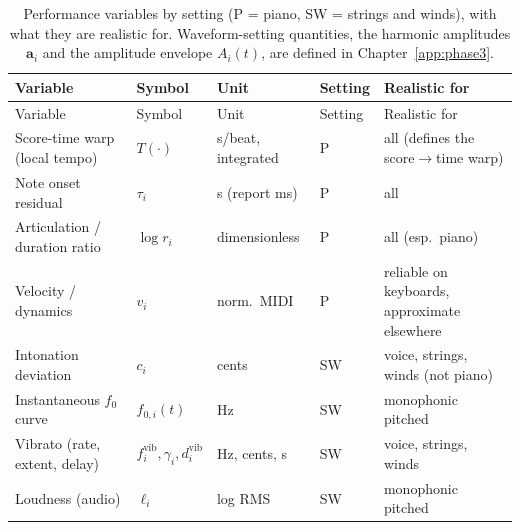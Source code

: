 \documentclass[11pt,a4paper]{report}
\begin{document}
{\footnotesize
\begin{longtable}{@{}p{3.1cm}p{2.0cm}p{2.0cm}p{1.1cm}p{4.0cm}@{}}
\caption{Performance variables by setting (P = piano, SW = strings and
winds), with what they are realistic for. Waveform-setting quantities,
the harmonic amplitudes $\mathbf a_i$ and the amplitude envelope $A_i(t)$, are
defined in Chapter~\ref{app:phase3}.}
\label{tab:variables}\\
\toprule
Variable & Symbol & Unit & Setting & Realistic for \\
\midrule
\endfirsthead
\toprule
Variable & Symbol & Unit & Setting & Realistic for \\
\midrule
\endhead
\bottomrule
\endfoot
Score-time warp (local tempo) & $T(\cdot)$ & s/beat, integrated & P & all (defines the score$\to$time warp) \\
Note onset residual & $\tau_i$ & s (report ms) & P & all \\
Articulation / duration ratio & $\log r_i$ & dimensionless & P & all (esp.\ piano) \\
Velocity / dynamics & $v_i$ & norm.\ MIDI & P & reliable on keyboards, approximate elsewhere \\
Intonation deviation & $c_i$ & cents & SW & voice, strings, winds (not piano) \\
Instantaneous $f_0$ curve & $f_{0,i}(t)$ & Hz & SW & monophonic pitched \\
Vibrato (rate, extent, delay) & $f_i^{\mathrm{vib}}, \gamma_i, d_i^{\mathrm{vib}}$ & Hz, cents, s & SW & voice, strings, winds \\
Loudness (audio) & $\ell_i$ & log RMS & SW & monophonic pitched \\
\end{longtable}}
\end{document}
